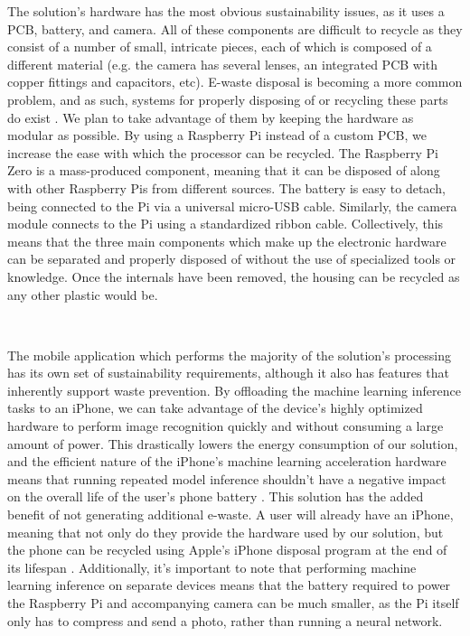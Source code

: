 \documentclass[a4paper,11pt]{article}
\begin{document}
\noindent
The solution's hardware has the most obvious sustainability issues, as it uses a PCB, battery, and camera. All of these components are difficult to recycle as they consist of a number of small, intricate pieces, each of which is composed of a different material (e.g. the camera has several lenses, an integrated PCB with copper fittings and capacitors, etc). E-waste disposal is becoming a more common problem, and as such, systems for properly disposing of or recycling these parts do exist \cite{ewaste}. We plan to take advantage of them by keeping the hardware as modular as possible. By using a Raspberry Pi instead of a custom PCB, we increase the ease with which the processor can be recycled. The Raspberry Pi Zero is a mass-produced component, meaning that it can be disposed of along with other Raspberry Pis from different sources. The battery is easy to detach, being connected to the Pi via a universal micro-USB cable. Similarly, the camera module connects to the Pi using a standardized ribbon cable. Collectively, this means that the three main components which make up the electronic hardware can be separated and properly disposed of without the use of specialized tools or knowledge. Once the internals have been removed, the housing can be recycled as any other plastic would be.

\

\noindent
The mobile application which performs the majority of the solution's processing has its own set of sustainability requirements, although it also has features that inherently support waste prevention. By offloading the machine learning inference tasks to an iPhone, we can take advantage of the device's highly optimized hardware to perform image recognition quickly and without consuming a large amount of power. This drastically lowers the energy consumption of our solution, and the efficient nature of the iPhone's machine learning acceleration hardware means that running repeated model inference shouldn't have a negative impact on the overall life of the user's phone battery \cite{neural-efficiency}. This solution has the added benefit of not generating additional e-waste. A user will already have an iPhone, meaning that not only do they provide the hardware used by our solution, but the phone can be recycled using Apple's iPhone disposal program at the end of its lifespan \cite{iphone-recycle}. Additionally, it's important to note that performing machine learning inference on separate devices means that the battery required to power the Raspberry Pi and accompanying camera can be much smaller, as the Pi itself only has to compress and send a photo, rather than running a neural network.
\end{document}
